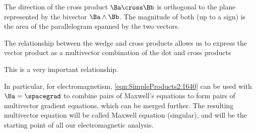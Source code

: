 The direction of the cross product \( \Ba \cross \Bb \) is orthogonal to the plane represented by the bivector \( \Ba \wedge \Bb \).  The magnitude of both (up to a sign) is the area of the parallelogram spanned by the two vectors.


The relationship between the wedge and cross products allows us to express the
 vector product as a multivector combination of the dot and cross products

This is a very important relationship.

In particular, for electromagnetism, \cref{eqn:SimpleProducts2:1640} can
be used with \( \Ba = \spacegrad \) to combine pairs of Maxwell's equations to form pairs of multivector gradient equations,
which can be merged further.
The resulting multivector equation will be
called
Maxwell equation (singular), and will be the starting point of all our electromagnetic analysis.

